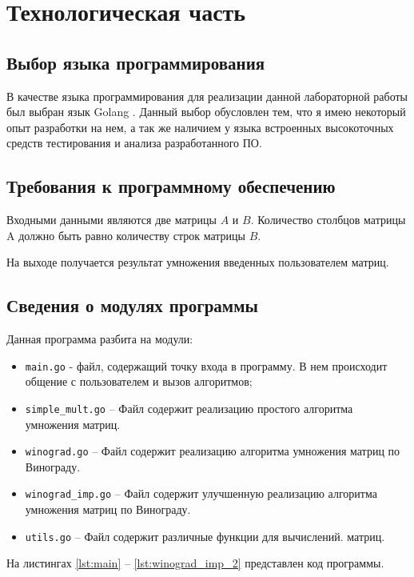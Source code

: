 \chapter{Технологическая часть}

\section{Выбор языка программирования}

В качестве языка программирования для реализации данной лабораторной работы был выбран язык Golang \cite{golang}. Данный выбор обусловлен тем, что я имею некоторый опыт разработки на нем, а так же наличием у языка встроенных высокоточных средств тестирования и анализа разработанного ПО.

\section{Требования к программному обеспечению}

Входными данными являются две матрицы $A$ и $B$.
Количество столбцов матрицы A должно быть равно количеству строк матрицы $B$. 

На выходе получается результат умножения введенных пользователем матриц.

\section{Сведения о модулях программы}

Данная программа разбита на модули:
\begin{itemize}
    \item \texttt{main.go} - файл, содержащий точку входа в программу. В нем происходит общение с пользователем и вызов алгоритмов;
    \item \texttt{simple\_mult.go} -- Файл содержит реализацию простого алгоритма умножения матриц.
    \item \texttt{winograd.go} -- Файл содержит реализацию алгоритма умножения матриц по Винограду.
    \item \texttt{winograd\_imp.go} -- Файл содержит улучшенную реализацию алгоритма умножения матриц по Винограду.
	\item \texttt{utils.go} -- Файл содержит различные функции для вычислений. матриц.
\end{itemize}

На листингах \ref{lst:main} -- \ref{lst:winograd_imp_2} представлен код программы.

